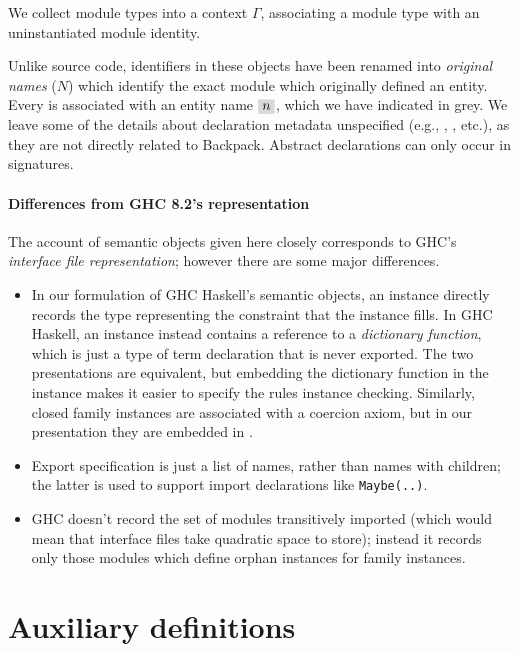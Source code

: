 We collect module types into a context $\Gamma$, associating a module type
with an uninstantiated module identity.


Unlike source code, identifiers in these objects have been renamed into \emph{original names} ($N$) which identify the exact module which originally defined an entity.  Every  is associated with an entity name $\graybox{n}$, which we have indicated in grey.  We leave some of the details about declaration metadata unspecified (e.g., , , etc.), as they are not directly related to Backpack.  Abstract declarations can only occur in signatures.

\paragraph{Differences from GHC 8.2's representation}  The account of semantic objects
given here closely corresponds to GHC's \emph{interface file representation}; however
there are some major differences.

\begin{itemize}
    \item In our formulation of GHC Haskell's semantic objects, an
    instance directly records the type representing the constraint that
    the instance fills.  In GHC Haskell, an instance instead contains a
    reference to a \emph{dictionary function}, which is just a type of
    term declaration that is never exported.  The two presentations are
    equivalent, but embedding the dictionary function in the instance
    makes it easier to specify the rules instance checking.  Similarly,
    closed family instances are associated with a coercion axiom, but in
    our presentation they are embedded in .

    \item Export specification is just a list of names, rather than names with
    children; the latter is used to support import declarations like
    \verb|Maybe(..)|.

    \item GHC doesn't record the set of modules transitively imported (which would
    mean that interface files take quadratic space to store); instead
    it records only those modules which define orphan instances for family instances.
\end{itemize}

\section{Auxiliary definitions}

